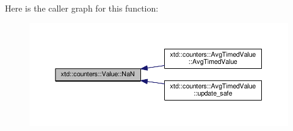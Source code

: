 Here is the caller graph for this function\-:
\nopagebreak
\begin{figure}[H]
\begin{center}
\leavevmode
\includegraphics[width=350pt]{classxtd_1_1counters_1_1Value_ab206db077ef38ac776a7e64774f56f2b_icgraph}
\end{center}
\end{figure}


